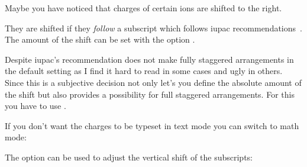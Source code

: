 \documentclass[load-preamble+]{cnltx-doc}
\begin{document}
Maybe you have noticed that charges of certain ions are shifted to the
right.
\begin{example}
    
\end{example}
They are shifted if they \emph{follow} a subscript which follows \ac{iupac}
recommendations~\cite[][p.\,51]{iupac:greenbook}.  The amount of the shift can
be set with the option .
\begin{example}
     \par
     \par
    
\end{example}

Despite \ac{iupac}'s recommendation \chemformula{} does not make fully staggered
arrangements in the default setting as I find it hard to read in some cases
and ugly in others.  Since this is a subjective decision \chemformula{} not only
let's you define the absolute amount of the shift but also provides a
possibility for full staggered arrangements.  For this you have to use
.
\begin{example}
    \par
    \par
    \par
   
\end{example}

If you don't want the charges to be typeset in text mode you can switch to
math mode:
\begin{example}
    \par
   
\end{example}

The option  can be used to adjust the vertical shift
of the subscripts:
\begin{example}
    \par
    \par
   
\end{example}
\end{document}
